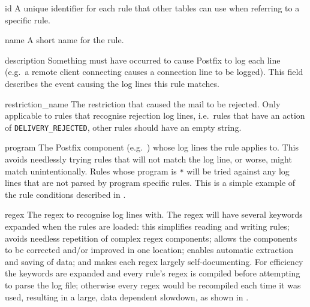 \begin{boldeqlist}

    \item [id] A unique identifier for each rule that other tables can use
        when referring to a specific rule.

    \item [name] A short name for the rule.

    \item [description] Something must have occurred to cause Postfix to
        log each line (e.g.\ a remote client connecting causes a connection
        line to be logged).  This field describes the event causing the log
        lines this rule matches.

    \item [restriction\_name] The restriction that caused the mail to be
        rejected.  Only applicable to rules that recognise rejection log
        lines, i.e.\ rules that have an action of
        \texttt{DELIVERY\_REJECTED}, other rules should have an empty
        string.

    \item [program] The Postfix component (e.g.\ ) whose log
        lines the rule applies to.  This avoids needlessly trying rules
        that will not match the log line, or worse, might match
        unintentionally.  Rules whose program is \texttt{*} will be tried
        against any log lines that are not parsed by program specific
        rules.  This is a simple example of the rule conditions described
        in .

    \item [regex] The regex to recognise log lines with.  The regex will
        have several keywords expanded when the rules are loaded: this
        simplifies reading and writing rules; avoids needless repetition of
        complex regex components; allows the components to be corrected
        and/or improved in one location; enables automatic extraction and
        saving of data; and makes each regex largely self-documenting.  For
        efficiency the keywords are expanded and every rule's regex is
        compiled before attempting to parse the log file; otherwise every
        regex would be recompiled each time it was used, resulting in a
        large, data dependent slowdown, as shown in .


\end{boldeqlist}
